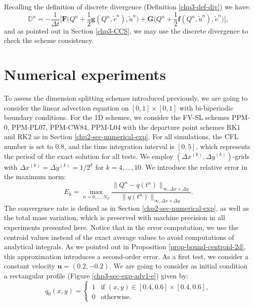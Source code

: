 Recalling the definition of discrete divergence (Definition \ref{chp3-def-div}) we have:
\begin{equation}
	\mathbb{D}^n = -\frac{1}{\Delta t}
	\bigg[
     \mathbf{F}\bigg(Q^n + \frac{1}{2}\mathbf{g}(Q^n,\tilde{v}^n), \tilde{u}^n \bigg) 
	+\mathbf{G}\bigg(Q^n + \frac{1}{2}\mathbf{f}(Q^n,\tilde{u}^n), \tilde{v}^n \bigg) \bigg],
\end{equation}
and as pointed out in Section \ref{chp3-CCS}, we may use the discrete divergence to check the scheme consistency. 


\section{Numerical experiments}
\label{sec-ds-exp}
To assess the dimension splitting schemes introduced previously, 
we are going to consider the linear advection equation on $[0,1]\times[0,1]$ 
with bi-biperiodic boundary conditions.
For the 1D schemes, we consider the FV-SL schemes PPM-0, PPM-PL07, PPM-CW84, PPM-L04
with the departure point schemes RK1 and RK2 as in Section \ref{chp2-sec-numerical-exp}.
For all simulations, the CFL number is set to $0.8$, and the time integration interval 
is $[0,5]$, which represents the period of the exact solution for all tests.
We employ $(\Delta x^{(k)},\Delta y^{(k)})$-grids with $\Delta x^{(k)} = \Delta y^{(k)} = 1/2^k$ for $k=4, \ldots, 10$.
We introduce the relative error in the maximum norm:
\begin{equation*}
	E_k = \max_{n=0,\ldots, N_T}
	\frac{\| Q^n - q(t^n) \|_{\infty, \Delta x \times \Delta y}}
	{\|q(t^n)\|_{\infty, \Delta x \times \Delta y}}.
\end{equation*}
The convergence rate is defined as in Section \ref{chp2-sec-numerical-exp}, 
as well as the total mass variation, which is preserved with machine precision
in all experiments presented here.
Notice that in the error computation, we use the centroid values instead
of the exact average values to avoid computations of analytical integrals.
As we pointed out in Proposition \ref{prop-bound-centroid-2d}, this approximation introduces a second-order error.
As a first test, we consider a constant velocity $\boldsymbol{u}=(0.2,-0.2)$.
We are going to consider as initial condition a rectangular profile
(Figure \ref{chp3-sec-exp-adv1-e}) given by:
\begin{equation}
	\label{chp3-ic1}
	q_0(x,y) =  
	\begin{cases}
		1 & \text{if } (x,y) \in [0.4,0.6]\times [0.4,0.6],\\
		0 & \text{otherwise}.
	\end{cases}
\end{equation}

